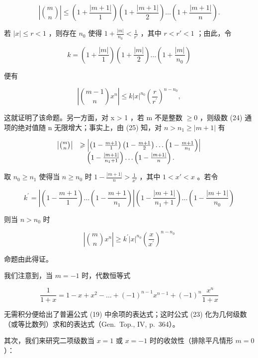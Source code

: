 \[
\left| \binom {m} {n} \right| \leqslant \left(1 + \frac {| m + 1 |}{1}\right) \left(1 + \frac {| m + 1 |}{2}\right) \dots \left(1 + \frac {| m + 1 |}{n}\right).
\]

若 \(|x| \leqslant r < 1\) ，则存在 \(n_0\) 使得 \(1 + \frac{|m|}{n_0} < \frac{1}{r'}\) ，其中 \(r < r' < 1\) ；由此，令

\[
k = \left(1 + \frac {| m |}{1}\right) \left(1 + \frac {| m |}{2}\right) \dots \left(1 + \frac {| m |}{n _ {0}}\right)
\]

便有

\[
\left| \binom {m - 1} {n} x ^ {n} \right| \leqslant k | x | ^ {n _ {0}} \left(\frac {r}{r ^ {\prime}}\right) ^ {n - n _ {0}},
\]

这就证明了该命题。另一方面，对 x \textgreater{} 1 ，若 m 不是整数 \(\geqslant 0\) ，则级数 (24) 通项的绝对值随 n 无限增大；事实上，由 (25) 知，对 \(n > n_{1} \geqslant |m + 1|\) 有

\[
\begin{array}{r l} \left| \binom {m} {n} \right| & \geqslant \left| \left(1 - \frac {m + 1}{1}\right) \left(1 - \frac {m + 1}{2}\right) \dots \left(1 - \frac {m + 1}{n _ {1}}\right) \right| \\ & \quad \left(1 - \frac {| m + 1 |}{n _ {1} + 1}\right) \dots \left(1 - \frac {| m + 1 |}{n}\right). \end{array}
\]

取 \(n_0 \geqslant n_1\) 使得当 \(n \geqslant n_0\) 时 \(1 - \frac{|m + 1|}{n} > \frac{1}{x'}\) ，其中 \(1 < x' < x\) 。若令

\[
k ^ {\prime} = \left| \left(1 - \frac {m + 1}{1}\right) \dots \left(1 - \frac {m + 1}{n _ {1}}\right) \right| \left(1 - \frac {| m + 1 |}{n _ {1} + 1}\right) \dots \left(1 - \frac {| m + 1 |}{n _ {0}}\right)
\]

则当 \(n > n_0\) 时

\[
\left| \binom {m} {n} x ^ {n} \right| \geqslant k ^ {\prime} | x | ^ {n _ {0}} \left(\frac {x}{x ^ {\prime}}\right) ^ {n - n _ {0}}
\]

命题由此得证。

我们注意到，当 \(m = -1\) 时，代数恒等式

\[
\frac {1}{1 + x} = 1 - x + x ^ {2} - \dots + (- 1) ^ {n - 1} x ^ {n - 1} + (- 1) ^ {n} \frac {x ^ {n}}{1 + x}\tag{26}
\]

无需积分便给出了普遍公式 (19) 中余项的表达式；这时公式 (23) 化为几何级数（或等比数列）求和的表达式（Gen.~Top., IV, p.~364）。

其次，我们来研究二项级数当 \(x = 1\) 或 \(x = -1\) 时的收敛性（排除平凡情形 \(m = 0\) ）：

